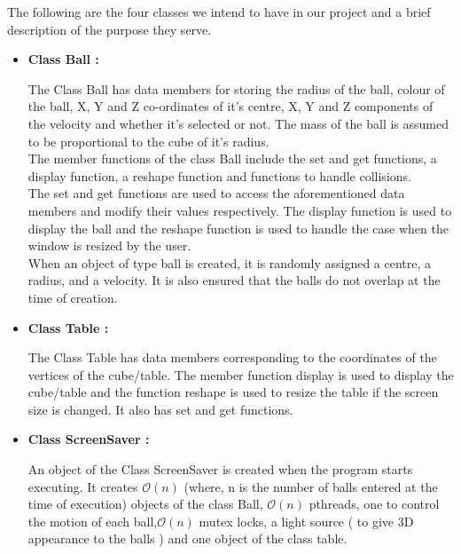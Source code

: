 \documentclass[]{article}
\begin{document}
The following are the four classes we intend to have in our project and a brief description of the purpose they serve.

\begin{itemize}

\item \textbf{Class Ball :}

\begin{flushleft}

The Class Ball has data members for storing the radius of the ball, colour of the ball, X, Y and Z co-ordinates of it's centre, X, Y and Z components of the velocity and whether it's selected or not. The mass of the ball is assumed to be proportional to the cube of it's radius. 
\\
The member functions of the class Ball include the set and get functions, a display function, a reshape function and functions to handle collisions.\\ The set and get functions are used to access the aforementioned data members and modify their values respectively. The display function is used to display the ball and the reshape function is used to handle the case when the window is resized by the user.\\
When an object of type ball is created, it is randomly assigned a centre, a radius, and a velocity. It is also ensured that the balls do not overlap at the time of creation.
\end{flushleft}

\item \textbf{Class Table :}

\begin{flushleft}

The Class Table has data members corresponding to the coordinates of the vertices of the cube/table. The member function display is used to display the cube/table and the function reshape is used to resize the table if the screen size is changed. It also has set and get functions.
\end{flushleft}


\item \textbf{Class ScreenSaver :}

\begin{flushleft}

An object of the Class ScreenSaver is created when the program starts executing. It creates $\mathcal{O}(n)$ (where, n is the number of balls entered at the time of execution) objects of the class Ball, $\mathcal{O}(n)$ pthreads, one to control the motion of each ball,$\mathcal{O}(n)$ mutex locks, a light source ( to give 3D appearance to the balls ) and one object of the class table. \\
\medskip


\end{flushleft}
\end{itemize}
\end{document}
